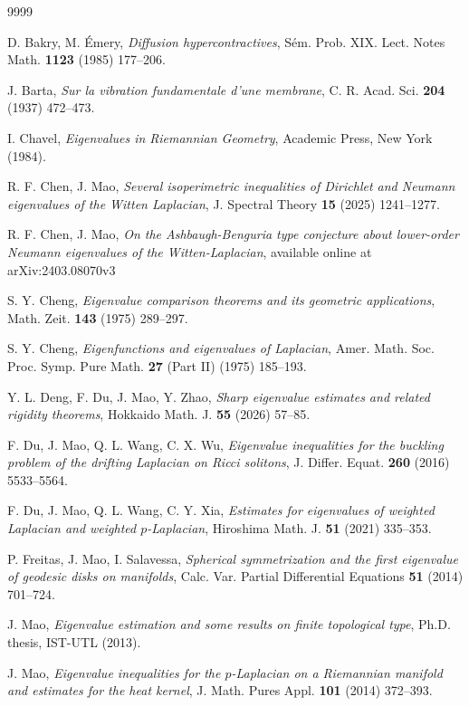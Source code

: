 \documentclass[12pt]{article}
\begin{document}
\begin{thebibliography}{9999}


 D. Bakry, M. \'{E}mery, \emph{Diffusion hypercontractives}, S\'{e}m.
Prob. XIX. Lect. Notes Math. {\bf 1123} (1985) 177--206.

 J. Barta, \emph{Sur la vibration fundamentale d'une
membrane}, C. R. Acad. Sci. {\bf 204} (1937) 472--473.


 I. Chavel, \emph{Eigenvalues in Riemannian Geometry}, Academic Press, New
York (1984).


 R. F. Chen, J. Mao, \emph{Several isoperimetric inequalities of Dirichlet and Neumann eigenvalues of the Witten
Laplacian}, J. Spectral Theory {\bf 15} (2025) 1241--1277.


 R. F. Chen, J. Mao, \emph{On the Ashbaugh-Benguria type conjecture about lower-order Neumann
eigenvalues of the Witten-Laplacian}, available online at
arXiv:2403.08070v3

 S. Y. Cheng, \emph{Eigenvalue comparison theorems and its geometric
applications}, Math. Zeit. {\bf143} (1975) 289--297.

 S. Y. Cheng, \emph{Eigenfunctions and eigenvalues of Laplacian},
Amer. Math. Soc. Proc. Symp. Pure Math. {\bf27} (Part II) (1975)
185--193.


 Y. L. Deng, F. Du, J. Mao, Y. Zhao, \emph{Sharp eigenvalue estimates and related rigidity
theorems}, Hokkaido Math. J. {\bf 55} (2026) 57--85.


 F. Du, J. Mao, Q. L. Wang, C. X. Wu, \emph{Eigenvalue inequalities for the buckling problem of the
drifting Laplacian on Ricci solitons}, J. Differ. Equat. {\bf 260}
(2016) 5533--5564.

 F. Du, J. Mao, Q. L. Wang, C. Y. Xia, \emph{Estimates for eigenvalues of weighted Laplacian and
weighted $p$-Laplacian}, Hiroshima Math. J. {\bf 51} (2021)
335--353.

 P. Freitas, J. Mao, I. Salavessa, \emph{Spherical symmetrization and the first eigenvalue of
geodesic disks on manifolds}, Calc. Var. Partial Differential
Equations {\bf 51} (2014) 701--724.


 J. Mao, \emph{Eigenvalue estimation and some results on finite topological
type}, Ph.D. thesis, IST-UTL (2013).



 J. Mao, \emph{Eigenvalue inequalities for the $p$-Laplacian on a Riemannian
manifold and estimates for the heat kernel}, J. Math. Pures Appl.
{\bf101} (2014) 372--393.



\end{thebibliography}
\end{document}
